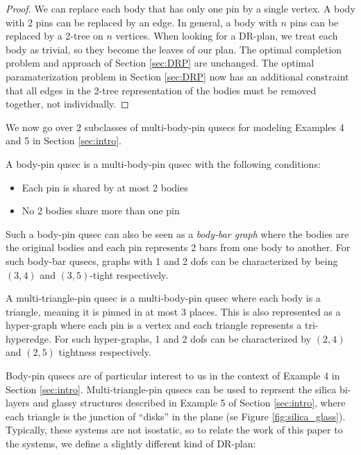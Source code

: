 \begin{proof}
    We can replace each body that has only one pin by a single vertex. A body with 2 pins can be replaced by an edge. In general, a body with $n$ pins can be replaced by a 2-tree on $n$ vertices. When looking for a DR-plan, we treat each body as trivial, so they become the leaves of our plan. The optimal completion problem and approach of Section \ref{sec:DRP} are unchanged. The optimal paramaterization problem in Section \ref{sec:DRP} now has an additional constraint that all edges in the 2-tree representation of the bodies must be removed together, not individually.
\end{proof}

We now go over 2 subclasses of multi-body-pin qusecs for modeling Examples 4 and 5 in Section \ref{sec:intro}.

\begin{definition}
\label{def:body-pin}
    A body-pin qusec is a multi-body-pin qusec with the following conditions:
    \begin{itemize}
        \item Each pin is shared by at most 2 bodies
        \item No 2 bodies share more than one pin
    \end{itemize}
    Such a body-pin qusec can also be seen as a {\em body-bar graph} where the bodies are the original bodies and each pin represents 2 bars from one body to another. For such body-bar qusecs, graphs with 1 and 2 dofs can be characterized by being $(3,4)$ and $(3,5)$-tight respectively.
\end{definition}

\begin{definition}
    A multi-triangle-pin qusec is a multi-body-pin qusec where each body is a triangle, meaning it is pinned in at most 3 places. This is also represented as a hyper-graph where each pin is a vertex and each triangle represents a tri-hyperedge. For such hyper-graphs, 1 and 2 dofs can be characterized by $(2,4)$ and $(2,5)$ tightness respectively.
\end{definition}

Body-pin qusecs are of particular interest to us in the context of Example 4 in Section \ref{sec:intro}. Multi-triangle-pin qusecs can be used to reprsent the silica bi-layers and glassy structures described in Example 5 of Section \ref{sec:intro}, where each triangle is the junction of ``disks'' in the plane (se Figure \ref{fig:silica_glass}). Typically, these systems are not isostatic, so to relate the work of this paper to the systems, we define a slightly different kind of DR-plan:

